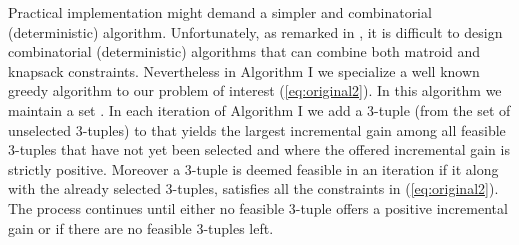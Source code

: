 \documentclass[11pt] {article}
\begin{document}
Practical implementation might demand a  simpler and combinatorial (deterministic) algorithm.  Unfortunately, as remarked in \cite{chandra:submod}, it is difficult to design combinatorial (deterministic) algorithms that can combine both matroid and knapsack constraints. Nevertheless in Algorithm I  we specialize a well known greedy algorithm to our problem of interest (\ref{eq:original2}).
 In this algorithm we maintain a set . In each iteration of  Algorithm I we add a 3-tuple (from the set of unselected 3-tuples) to  that yields the largest incremental gain among all feasible 3-tuples that have not yet been selected and where the offered incremental gain is strictly positive. Moreover a 3-tuple is deemed feasible in an iteration if it along with the already selected 3-tuples, satisfies all the constraints in (\ref{eq:original2}). The process continues until either no feasible 3-tuple offers a positive incremental gain or if there are no feasible 3-tuples left.
\end{document}
